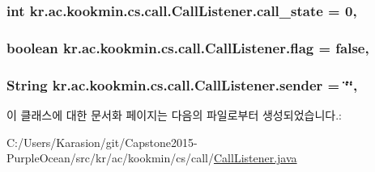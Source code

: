 \subsubsection[{call\+\_\+state}]{\setlength{\rightskip}{0pt plus 5cm}int kr.\+ac.\+kookmin.\+cs.\+call.\+Call\+Listener.\+call\+\_\+state = 0\hspace{0.3cm}{\ttfamily [static]}, {\ttfamily [private]}}\label{classkr_1_1ac_1_1kookmin_1_1cs_1_1call_1_1_call_listener_a03420a995d78c4421f4fe92b75be5647}
\hypertarget{classkr_1_1ac_1_1kookmin_1_1cs_1_1call_1_1_call_listener_a43a92315d34bbf897048aea788679fbc}{}
\subsubsection[{flag}]{\setlength{\rightskip}{0pt plus 5cm}boolean kr.\+ac.\+kookmin.\+cs.\+call.\+Call\+Listener.\+flag = false\hspace{0.3cm}{\ttfamily [static]}, {\ttfamily [private]}}\label{classkr_1_1ac_1_1kookmin_1_1cs_1_1call_1_1_call_listener_a43a92315d34bbf897048aea788679fbc}
\hypertarget{classkr_1_1ac_1_1kookmin_1_1cs_1_1call_1_1_call_listener_a87caf58642cf13014f53edb0fdcda07b}{}
\subsubsection[{sender}]{\setlength{\rightskip}{0pt plus 5cm}String kr.\+ac.\+kookmin.\+cs.\+call.\+Call\+Listener.\+sender = \char`\"{}\char`\"{}\hspace{0.3cm}{\ttfamily [static]}, {\ttfamily [private]}}\label{classkr_1_1ac_1_1kookmin_1_1cs_1_1call_1_1_call_listener_a87caf58642cf13014f53edb0fdcda07b}


이 클래스에 대한 문서화 페이지는 다음의 파일로부터 생성되었습니다.\+:\begin{DoxyCompactItemize}
\item 
C\+:/\+Users/\+Karasion/git/\+Capstone2015-\/\+Purple\+Ocean/src/kr/ac/kookmin/cs/call/\hyperlink{_call_listener_8java}{Call\+Listener.\+java}\end{DoxyCompactItemize}
